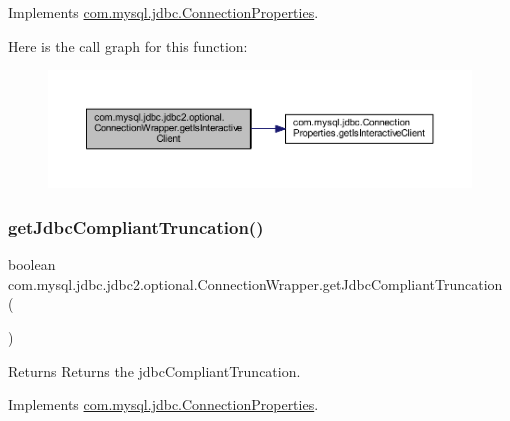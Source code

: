Implements \mbox{\hyperlink{interfacecom_1_1mysql_1_1jdbc_1_1_connection_properties_a691575c40598ee5b000bed491d3ef096}{com.\+mysql.\+jdbc.\+Connection\+Properties}}.

Here is the call graph for this function\+:
\nopagebreak
\begin{figure}[H]
\begin{center}
\leavevmode
\includegraphics[width=350pt]{classcom_1_1mysql_1_1jdbc_1_1jdbc2_1_1optional_1_1_connection_wrapper_ae1fd8eb0bb01d247ca9db06d0fb3377f_cgraph}
\end{center}
\end{figure}
\mbox{\label{classcom_1_1mysql_1_1jdbc_1_1jdbc2_1_1optional_1_1_connection_wrapper_a3daafc5194855212c6b6c0c30fb449b7}} 
\subsubsection{\texorpdfstring{get\+Jdbc\+Compliant\+Truncation()}{getJdbcCompliantTruncation()}}
{\footnotesize\ttfamily boolean com.\+mysql.\+jdbc.\+jdbc2.\+optional.\+Connection\+Wrapper.\+get\+Jdbc\+Compliant\+Truncation (\begin{DoxyParamCaption}{ }\end{DoxyParamCaption})}

\begin{DoxyReturn}{Returns}
Returns the jdbc\+Compliant\+Truncation. 
\end{DoxyReturn}


Implements \mbox{\hyperlink{interfacecom_1_1mysql_1_1jdbc_1_1_connection_properties_a97ae1e1a15afdeb0b6a04efd3d58459e}{com.\+mysql.\+jdbc.\+Connection\+Properties}}.

